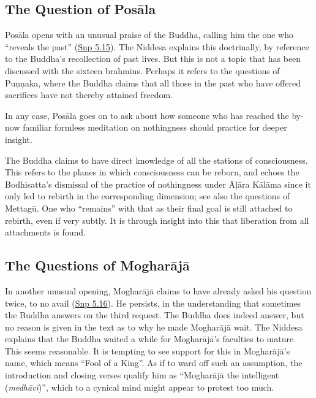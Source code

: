 \documentclass[12pt,openany]{book}%
\begin{document}
\subsection*{The Question of \textsanskrit{Posāla}}

\textsanskrit{Posāla} opens with an unusual praise of the Buddha, calling him the one who “reveals the past” (\href{https://suttacentral.net/snp5.15/en/sujato}{Snp 5.15}). The Niddesa explains this doctrinally, by reference to the Buddha’s recollection of past lives. But this is not a topic that has been discussed with the sixteen brahmins. Perhaps it refers to the questions of \textsanskrit{Puṇṇaka}, where the Buddha claims that all those in the past who have offered sacrifices have not thereby attained freedom.

In any case, \textsanskrit{Posāla} goes on to ask about how someone who has reached the by-now familiar formless meditation on nothingness should practice for deeper insight.

The Buddha claims to have direct knowledge of all the stations of consciousness. This refers to the planes in which consciousness can be reborn, and echoes the Bodhisatta's dismissal of the practice of nothingness under \textsanskrit{Āḷāra} \textsanskrit{Kālāma} since it only led to rebirth in the corresponding dimension; see also the questions of \textsanskrit{Mettagū}. One who “remains” with that as their final goal is still attached to rebirth, even if very subtly. It is through insight into this that liberation from all attachments is found.

\subsection*{The Questions of \textsanskrit{Mogharājā}}

In another unusual opening, \textsanskrit{Mogharājā} claims to have already asked his question twice, to no avail (\href{https://suttacentral.net/snp5.16/en/sujato}{Snp 5.16}). He persists, in the understanding that sometimes the Buddha answers on the third request. The Buddha does indeed answer, but no reason is given in the text as to why he made \textsanskrit{Mogharājā} wait. The Niddesa explains that the Buddha waited a while for \textsanskrit{Mogharājā}’s faculties to mature. This seems reasonable. It is tempting to see support for this in \textsanskrit{Mogharājā}’s name, which means “Fool of a King”. As if to ward off such an assumption, the introduction and closing verses qualify him as “\textsanskrit{Mogharājā} the intelligent (\textit{\textsanskrit{medhāvī}})”, which to a cynical mind might appear to protest too much.
\end{document}
